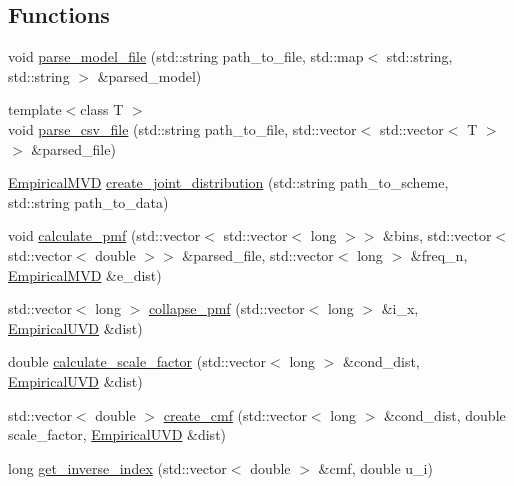 \subsection*{Functions}
\begin{DoxyCompactItemize}
\item 
void \hyperlink{namespacesolar__core_1_1tools_ad27b346e42787b5220c80cd386eae266}{parse\+\_\+model\+\_\+file} (std\+::string path\+\_\+to\+\_\+file, std\+::map$<$ std\+::string, std\+::string $>$ \&parsed\+\_\+model)
\item 
{\footnotesize template$<$class T $>$ }\\void \hyperlink{namespacesolar__core_1_1tools_ae8bc4dd0c291632fc369b647480c30eb}{parse\+\_\+csv\+\_\+file} (std\+::string path\+\_\+to\+\_\+file, std\+::vector$<$ std\+::vector$<$ T $>$$>$ \&parsed\+\_\+file)
\item 
\hyperlink{classsolar__core_1_1tools_1_1_empirical_m_v_d}{Empirical\+M\+V\+D} \hyperlink{namespacesolar__core_1_1tools_a460021055d6057f219037f378c0c3248}{create\+\_\+joint\+\_\+distribution} (std\+::string path\+\_\+to\+\_\+scheme, std\+::string path\+\_\+to\+\_\+data)
\item 
void \hyperlink{namespacesolar__core_1_1tools_a0afae1319ed9c683eba7bf2916d0850d}{calculate\+\_\+pmf} (std\+::vector$<$ std\+::vector$<$ long $>$$>$ \&bins, std\+::vector$<$ std\+::vector$<$ double $>$$>$ \&parsed\+\_\+file, std\+::vector$<$ long $>$ \&freq\+\_\+n, \hyperlink{classsolar__core_1_1tools_1_1_empirical_m_v_d}{Empirical\+M\+V\+D} \&e\+\_\+dist)
\item 
std\+::vector$<$ long $>$ \hyperlink{namespacesolar__core_1_1tools_ace8f7b4ee917995274fe32b95e27f6ef}{collapse\+\_\+pmf} (std\+::vector$<$ long $>$ \&i\+\_\+x, \hyperlink{classsolar__core_1_1tools_1_1_empirical_u_v_d}{Empirical\+U\+V\+D} \&dist)
\item 
double \hyperlink{namespacesolar__core_1_1tools_a3994daf7d839df36bc1f424c426cb6a5}{calculate\+\_\+scale\+\_\+factor} (std\+::vector$<$ long $>$ \&cond\+\_\+dist, \hyperlink{classsolar__core_1_1tools_1_1_empirical_u_v_d}{Empirical\+U\+V\+D} \&dist)
\item 
std\+::vector$<$ double $>$ \hyperlink{namespacesolar__core_1_1tools_a09224182e02de7fdadabfba4e08e0ac2}{create\+\_\+cmf} (std\+::vector$<$ long $>$ \&cond\+\_\+dist, double scale\+\_\+factor, \hyperlink{classsolar__core_1_1tools_1_1_empirical_u_v_d}{Empirical\+U\+V\+D} \&dist)
\item 
long \hyperlink{namespacesolar__core_1_1tools_a5826bf3d73d587e67bba31912e73862a}{get\+\_\+inverse\+\_\+index} (std\+::vector$<$ double $>$ \&cmf, double u\+\_\+i)
$$
\end{DoxyCompactItemize}
